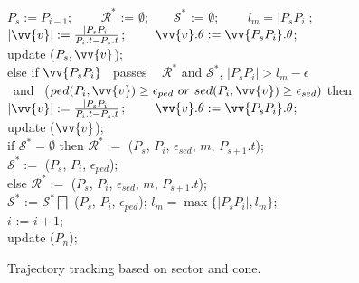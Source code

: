 \begin{figure}[tb!]
\begin{center}
{\begin{minipage}{3.3in}
{					\icc \>\hspace{7ex}    $P_s := P_{i-1}$; ~~~~$\mathcal{R}^*$ := $\emptyset$;~~~~$\mathcal{S}^*$ := $\emptyset$; ~~~~$l_{m} = |P_sP_{i}|$;\\
					\icc \>\hspace{7ex}    $|\vv{v}|:=\frac{|P_sP_{i}|}{P_{i}.t-P_s.t}$; ~~~~$\vv{v}.\theta:=\vv{P_{s}P_{i}}.\theta$;  \\
					\icc \>\hspace{7ex}    update ($P_{s}, \vv{v}$); 	\\
					\icc \>\hspace{3ex} else if $\vv{P_sP_{i}}$ ~passes ~ $\mathcal{R}^*$ and $\mathcal{S}^*$, $|P_sP_{i}| > l_{m} - \epsilon$ \\ \hspace{9ex} ~and~ ($ped(P_i, \vv{v}) \ge \epsilon_{ped} ~or~ sed(P_i, \vv{v}) \ge \epsilon_{sed}) $ then  \\ %
					\icc \>\hspace{7ex}    $|\vv{v}|:=\frac{|P_sP_{i}|}{P_{i}.t-P_s.t}$; ~~~~$\vv{v}.\theta:=\vv{P_sP_{i}}.\theta$; \\
					\icc \>\hspace{7ex}    update ($\vv{v}$); \\
					\icc \>\hspace{3ex} if $\mathcal{S}^*=\emptyset$ then $\mathcal{R}^*:=$ ($P_s$, $P_{i}$, $\epsilon_{sed}$, $m$, $P_{s+1}.t$); \\
					\icc \>\hspace{7ex}    $\mathcal{S}^*:=$ ($P_s$, $P_{i}$, $\epsilon_{ped}$); \\
					\icc \>\hspace{3ex} else $\mathcal{R}^*:=$ ($P_s$, $P_{i}$, $\epsilon_{sed}$, $m$, $P_{s+1}.t$); \\
					\icc \>\hspace{7ex}    $\mathcal{S}^*$ := $\mathcal{S}^*\bigsqcap$ ($P_s$, $P_{i}$, $\epsilon_{ped}$); $l_{m} = \max\{|P_sP_{i}|, l_{m}\}$;\\
					\icc \>\hspace{3ex} $i$ := $i +1$;\\
					\icc \>\hspace{0ex} update ($P_{n}$); 
				}
				\vspace{-2ex}
				\myhrule
			\end{minipage}
		}
	\end{center}
	\vspace{-1ex}
	\caption{\small Trajectory tracking based on sector and cone.}
	\label{alg:bitt}
	\vspace{-1ex}
\end{figure}




